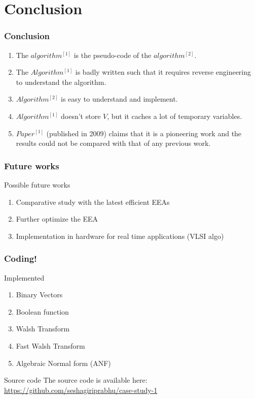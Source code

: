 \documentclass[12pt]{beamer}
\newcommand\Colorhref[3][cyan]{\href{#2}{\small\color{#1}#3}}
\begin{document}
\section{Conclusion}
\begin{frame}
\frametitle{Conclusion}
	\begin{enumerate}
		\item The $algorithm^{[1]}$ is the pseudo-code of the $algorithm^{[2]}$.
	   	\item The $Algorithm^{[1]}$ is badly written such that it requires reverse engineering to understand the algorithm.
	   	\item $Algorithm^{[2]}$ is easy to understand and implement.
	   	\item $Algorithm^{[1]}$ doesn't store $V$, but it caches a lot of temporary variables.
	   	\item $Paper^{[1]}$ (published in 2009) claims that it is a pioneering work and the results could not be compared with that of any previous work.
	\end{enumerate}
\end{frame}

\begin{frame}
\frametitle{Future works}
  \begin{block}{Possible future works}
  	\begin{enumerate}
  		\item Comparative study with the latest efficient EEAs
  		\item Further optimize the EEA
  		\item Implementation in hardware for real time applications (VLSI algo)
  	\end{enumerate}
  \end{block}
\end{frame}

\begin{frame}
\frametitle {Coding!}
	\begin{block}{Implemented}
		\begin{enumerate}
			\item Binary Vectors
			\item Boolean function
			\item Walsh Transform
			\item Fast Walsh Transform
			\item Algebraic Normal form (ANF)
		\end{enumerate}
	\end{block}

	\begin{block}{Source code}
	The source code is available here: \Colorhref{https://github.com/seshagiriprabhu/case-study-1}		 {https://github.com/seshagiriprabhu/case-study-1}

	\end{block}
\end{frame}
\end{document}

